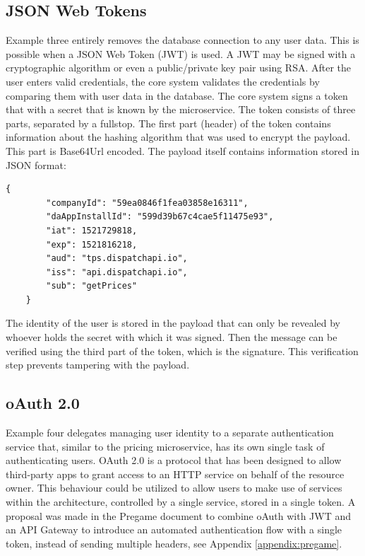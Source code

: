 \subsection{JSON Web Tokens}
Example three entirely removes the database connection to any user data. This is possible when a JSON Web Token (JWT) is used. A JWT may be signed with a cryptographic algorithm or even a public/private key pair using RSA. After the user enters valid credentials, the core system validates the credentials by comparing them with user data in the database. The core system signs a token that with a secret that is known by the microservice. The token consists of three parts, separated by a fullstop. The first part (header) of the token contains information about the hashing algorithm that was used to encrypt the payload. This part is Base64Url encoded. The payload itself contains information stored in JSON format:


\begin{center}
\end{center}

\begin{Verbatim}[fontsize=\scriptsize]
	{
		"companyId": "59ea0846f1fea03858e16311",
		"daAppInstallId": "599d39b67c4cae5f11475e93",
		"iat": 1521729818,
		"exp": 1521816218,
		"aud": "tps.dispatchapi.io",
		"iss": "api.dispatchapi.io",
		"sub": "getPrices"
	}
\end{Verbatim}

The identity of the user is stored in the payload that can only be revealed by whoever holds the secret with which it was signed. Then the message can be verified using the third part of the token, which is the signature. This verification step prevents tampering with the payload.

\subsection{oAuth 2.0}
Example four delegates managing user identity to a separate authentication service that, similar to the pricing microservice, has its own single task of authenticating users. OAuth 2.0 is a protocol that has been designed to allow third-party apps to grant access to an HTTP service on behalf of the resource owner. This behaviour could be utilized to allow users to make use of services within the architecture, controlled by a single service, stored in a single token. A proposal was made in the Pregame document to combine oAuth with JWT and an API Gateway to introduce an automated authentication flow with a single token, instead of sending multiple headers, see Appendix \ref{appendix:pregame}.

